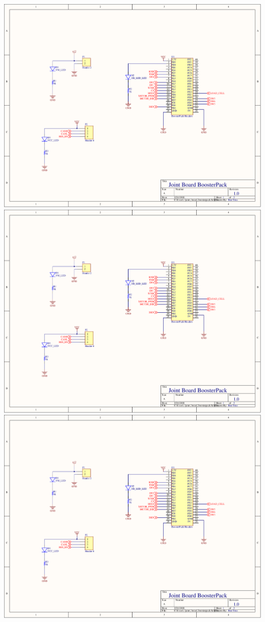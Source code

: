 \includegraphics[page=3,width=\textwidth,angle=270]{PDFs/joint_board_boosterpack.PDF} \newpage
\includegraphics[page=4,width=\textwidth,angle=270]{PDFs/joint_board_boosterpack.PDF} \newpage
\includegraphics[page=5,width=\textwidth,angle=270]{PDFs/joint_board_boosterpack.PDF} \newpage
